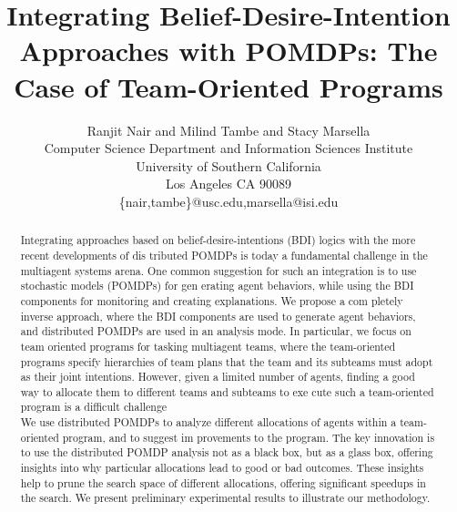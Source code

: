 \documentclass{IEEEtran}
\begin{document}
\title{\LARGE Integrating Belief-Desire-Intention Approaches with POMDPs: The Case of
Team-Oriented Programs}
\author{Ranjit Nair and Milind Tambe and Stacy Marsella\\
        Computer Science Department and Information Sciences Institute\\
        University of Southern California\\
        Los Angeles CA 90089\\
         \{nair,tambe\}@usc.edu,marsella@isi.edu}
\maketitle
\begin{abstract}
    Integrating approaches based on belief-desire-intentions
    (BDI) logics with the more recent developments of dis
   tributed POMDPs is today a fundamental challenge in the
    multiagent systems arena. One common suggestion for such
    an integration is to use stochastic models (POMDPs) for gen
   erating agent behaviors, while using the BDI components for
    monitoring and creating explanations. We propose a com
   pletely inverse approach, where the BDI components are used
    to generate agent behaviors, and distributed POMDPs are
    used in an analysis mode. In particular, we focus on team
   oriented programs for tasking multiagent teams, where the
    team-oriented programs specify hierarchies of team plans that
    the team and its subteams must adopt as their joint intentions.
    However, given a limited number of agents, finding a good
    way to allocate them to different teams and subteams to exe
   cute such a team-oriented program is a difficult challenge
    \\We use distributed POMDPs to analyze different allocations
    of agents within a team-oriented program, and to suggest im
   provements to the program. The key innovation is to use
    the distributed POMDP analysis not as a black box, but as
    a glass box, offering insights into why particular allocations
    lead to good or bad outcomes. These insights help to prune
    the search space of different allocations, offering significant
    speedups in the search. We present preliminary experimental
    results to illustrate our methodology.
\end{abstract}
\end{document}
